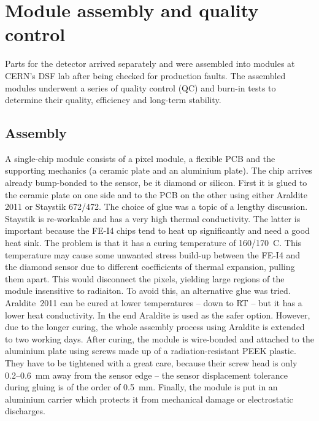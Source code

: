 \section{Module assembly and quality control}
Parts for the detector arrived separately and were assembled into modules at CERN's DSF lab after being checked for production faults. The assembled modules underwent a series of quality control (QC) and burn-in tests to determine their quality, efficiency and long-term stability.
\subsection{Assembly}
A single-chip module consists of a pixel module, a flexible PCB and the supporting mechanics (a ceramic plate and an aluminium plate). The chip arrives already bump-bonded to the sensor, be it diamond or silicon. First it is glued to the ceramic plate on one side and to the PCB on the other using either Araldite 2011 or Staystik 672/472. The choice of glue was a topic of a lengthy discussion. Staystik is re-workable and has a very high thermal conductivity. The latter is important because the FE-I4 chips tend to heat up significantly and need a good heat sink. The problem is that it has a curing temperature of 160/170~\textdegree C. This temperature may cause some unwanted stress build-up between the FE-I4 and the diamond sensor due to different coefficients of thermal expansion, pulling them apart. This would disconnect the pixels, yielding large regions of the module insensitive to radiaiton. To avoid this, an alternative glue was tried. Araldite~2011 can be cured at lower temperatures -- down to RT -- but it has a lower heat conductivity. In the end Araldite is used as the safer option. However, due to the longer curing, the whole assembly process using Araldite is extended to two working days. After curing, the module is wire-bonded and attached to the aluminium plate using screws made up of a radiation-resistant PEEK plastic. They have to be tightened with a great care, because their screw head is only 0.2--0.6~mm away from the sensor edge -- the sensor displacement tolerance during gluing is of the order of 0.5~mm. Finally, the module is put in an aluminium carrier which protects it from mechanical damage or electrostatic discharges.

